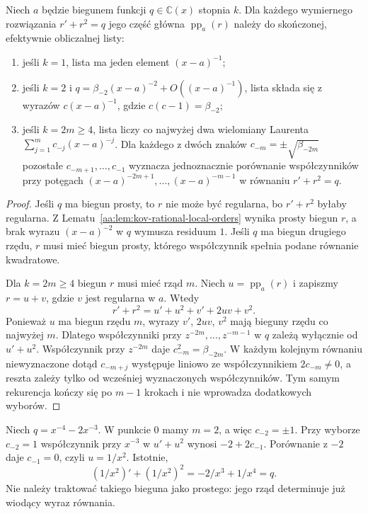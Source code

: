 \begin{lemat}
\label{aa:lem:kov-rational-local-candidates}
Niech $a$ będzie biegunem funkcji
$q\in\mathbb C(x)$ stopnia $k$.
Dla każdego wymiernego rozwiązania
$r'+r^2=q$ jego część główna
$\operatorname{pp}_a(r)$ należy
do skończonej, efektywnie
obliczalnej listy:
\begin{enumerate}
\item jeśli $k=1$, lista
ma jeden element $(x-a)^{-1}$;
\item jeśli $k=2$ i
$q=\beta_{-2}(x-a)^{-2}+
O((x-a)^{-1})$, lista składa
się z wyrazów $c(x-a)^{-1}$,
gdzie $c(c-1)=\beta_{-2}$;
\item jeśli $k=2m\ge4$,
lista liczy co najwyżej
dwa wielomiany Laurenta
$\sum_{j=1}^m c_{-j}(x-a)^{-j}$.
Dla każdego z dwóch znaków
$c_{-m}=\pm\sqrt{\beta_{-2m}}$
pozostałe $c_{-m+1},\ldots,c_{-1}$
wyznacza jednoznacznie
porównanie współczynników
przy potęgach
$(x-a)^{-2m+1},\ldots,(x-a)^{-m-1}$
w równaniu
$r'+r^2=q$.
\end{enumerate}
\end{lemat}
\begin{proof}
Jeśli $q$ ma biegun prosty,
to $r$ nie może być regularna,
bo $r'+r^2$ byłaby regularna.
Z Lematu~\ref{aa:lem:kov-rational-local-orders}
wynika prosty biegun $r$,
a brak wyrazu $(x-a)^{-2}$
w $q$ wymusza residuum $1$.
Jeśli $q$ ma biegun drugiego rzędu,
$r$ musi mieć biegun prosty,
którego współczynnik spełnia
podane równanie kwadratowe.

Dla $k=2m\ge4$ biegun $r$
musi mieć rząd $m$.
Niech $u=\operatorname{pp}_a(r)$
i zapiszmy $r=u+v$,
gdzie $v$ jest regularna w $a$.
Wtedy
\[
 r'+r^2=u'+u^2+v'+2uv+v^2.
\]
Ponieważ $u$ ma biegun rzędu $m$,
wyrazy $v'$, $2uv$, $v^2$
mają bieguny rzędu
co najwyżej $m$.
Dlatego współczynniki
przy $z^{-2m},\ldots,z^{-m-1}$
w $q$ zależą wyłącznie
od $u'+u^2$.
Współczynnik przy $z^{-2m}$
daje $c_{-m}^2=\beta_{-2m}$.
W każdym kolejnym równaniu
niewyznaczone dotąd
$c_{-m+j}$ występuje liniowo
ze współczynnikiem
$2c_{-m}\ne0$,
a reszta zależy tylko
od wcześniej wyznaczonych
współczynników.
Tym samym rekurencja
kończy się po $m-1$
krokach i nie wprowadza
dodatkowych wyborów.
\end{proof}

\begin{przyklad}
\label{aa:prz:kov-rational-high-pole}
Niech $q=x^{-4}-2x^{-3}$.
W punkcie $0$ mamy $m=2$,
a więc $c_{-2}=\pm1$.
Przy wyborze $c_{-2}=1$
współczynnik przy $x^{-3}$
w $u'+u^2$ wynosi
$-2+2c_{-1}$.
Porównanie z $-2$
daje $c_{-1}=0$,
czyli $u=1/x^2$.
Istotnie,
\[
 (1/x^2)' +(1/x^2)^2
 =-2/x^3+1/x^4=q.
\]
Nie należy traktować
takiego bieguna jako
prostego: jego rząd
determinuje już wiodący
wyraz równania.
\end{przyklad}


